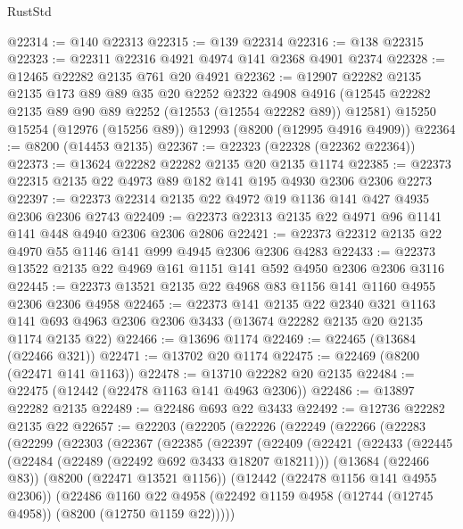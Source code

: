 \begin{lexlean}{RustStd}
\begin{coremodule}
@22314 := @140 @22313
@22315 := @139 @22314
@22316 := @138 @22315
@22323 := @22311 @22316 @4921 @4974 @141 @2368 @4901 @2374
@22328 := @12465 @22282 @2135 @761 @20 @4921
@22362 := @12907
    @22282
    @2135
    @2135
    @173
    @89
    @89
    @35
    @20
    @2252
    @2322
    @4908
    @4916
    (@12545 @22282 @2135 @89 @90 @89 @2252 (@12553 (@12554 @22282 @89)) @12581)
    @15250
    @15254
    (@12976 (@15256 @89))
    @12993
    (@8200 (@12995 @4916 @4909))
@22364 := @8200 (@14453 @2135)
@22367 := @22323 (@22328 (@22362 @22364))
@22373 := @13624 @22282 @22282 @2135 @20 @2135 @1174
@22385 := @22373 @22315 @2135 @22 @4973 @89 @182 @141 @195 @4930 @2306 @2306 @2273
@22397 := @22373 @22314 @2135 @22 @4972 @19 @1136 @141 @427 @4935 @2306 @2306 @2743
@22409 := @22373 @22313 @2135 @22 @4971 @96 @1141 @141 @448 @4940 @2306 @2306 @2806
@22421 := @22373 @22312 @2135 @22 @4970 @55 @1146 @141 @999 @4945 @2306 @2306 @4283
@22433 := @22373 @13522 @2135 @22 @4969 @161 @1151 @141 @592 @4950 @2306 @2306 @3116
@22445 := @22373 @13521 @2135 @22 @4968 @83 @1156 @141 @1160 @4955 @2306 @2306 @4958
@22465 := @22373
    @141
    @2135
    @22
    @2340
    @321
    @1163
    @141
    @693
    @4963
    @2306
    @2306
    @3433
    (@13674 @22282 @2135 @20 @2135 @1174 @2135 @22)
@22466 := @13696 @1174
@22469 := @22465 (@13684 (@22466 @321))
@22471 := @13702 @20 @1174
@22475 := @22469 (@8200 (@22471 @141 @1163))
@22478 := @13710 @22282 @20 @2135
@22484 := @22475 (@12442 (@22478 @1163 @141 @4963 @2306))
@22486 := @13897 @22282 @2135
@22489 := @22486 @693 @22 @3433
@22492 := @12736 @22282 @2135 @22
@22657 := @22203
    (@22205
      (@22226
        (@22249
          (@22266
            (@22283
              (@22299
                (@22303
                  (@22367
                    (@22385
                      (@22397
                        (@22409
                          (@22421
                            (@22433
                              (@22445
                                (@22484 (@22489 (@22492 @692 @3433 @18207 @18211)))
                                (@13684 (@22466 @83))
                                (@8200 (@22471 @13521 @1156))
                                (@12442 (@22478 @1156 @141 @4955 @2306))
                                (@22486
                                  @1160
                                  @22
                                  @4958
                                  (@22492
                                    @1159
                                    @4958
                                    (@12744 (@12745 @4958))
                                    (@8200 (@12750 @1159 @22)))))

\end{coremodule}
\end{lexlean}
